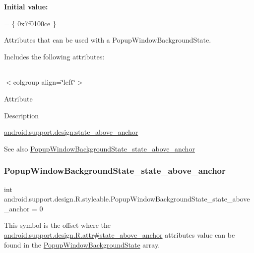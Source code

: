 {\bfseries Initial value\+:}
\begin{DoxyCode}
= \{
            0x7f0100ce
        \}
\end{DoxyCode}
Attributes that can be used with a Popup\+Window\+Background\+State. 

Includes the following attributes\+:

\tabulinesep=1mm
\begin{longtabu} spread 0pt [c]{*{0}{|X[-1]}|}
\hline
\end{longtabu}
$<$colgroup align=\char`\"{}left\char`\"{}$>$ 

Attribute

Description 

{\ttfamily \hyperlink{classandroid_1_1support_1_1design_1_1R_1_1styleable_af8ee0d52ab3d5a56c7009cde8f3c8f02}{android.\+support.\+design\+:state\+\_\+above\+\_\+anchor}}

\begin{DoxySeeAlso}{See also}
\hyperlink{classandroid_1_1support_1_1design_1_1R_1_1styleable_af8ee0d52ab3d5a56c7009cde8f3c8f02}{Popup\+Window\+Background\+State\+\_\+state\+\_\+above\+\_\+anchor} 
\end{DoxySeeAlso}
\mbox{\label{classandroid_1_1support_1_1design_1_1R_1_1styleable_af8ee0d52ab3d5a56c7009cde8f3c8f02}} 
\subsubsection{\texorpdfstring{Popup\+Window\+Background\+State\+\_\+state\+\_\+above\+\_\+anchor}{PopupWindowBackgroundState\_state\_above\_anchor}}
{\footnotesize\ttfamily int android.\+support.\+design.\+R.\+styleable.\+Popup\+Window\+Background\+State\+\_\+state\+\_\+above\+\_\+anchor = 0\hspace{0.3cm}{\ttfamily [static]}}

This symbol is the offset where the \hyperlink{classandroid_1_1support_1_1design_1_1R_1_1attr_a71358048ede13b57275c399f9dc04e71}{android.\+support.\+design.\+R.\+attr\#state\+\_\+above\+\_\+anchor} attribute\textquotesingle{}s value can be found in the \hyperlink{classandroid_1_1support_1_1design_1_1R_1_1styleable_a0fa0763898706ab0c593a428f940c3e1}{Popup\+Window\+Background\+State} array.

